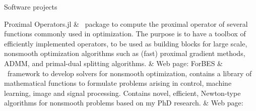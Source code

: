 \begin{cvsection}{Software projects \subtitle{GitHub profile: \href{\mygithubURL}{}}
	}
Proximal Operators.jl		& \ package to compute the proximal operator of several functions commonly used in optimization. The purpose is to have a toolbox of efficiently implemented operators, to be used as building blocks for large scale, nonsmooth optimization algorithms such as (fast) proximal gradient methods, ADMM, and primal-dual splitting algorithms. \spacednewline
			& Web page: \href{https://github.com/kul-forbes/ProximalOperators.jl}{}\spacednewline
ForBES		& \ framework to develop solvers for nonsmooth optimization, contains a library of mathematical functions to formulate problems arising in control, machine learning, image and signal processing.
Contains novel, efficient, Newton-type algorithms for nonsmooth problems based on my PhD research. \spacednewline
			& Web page: \href{https://kul-forbes.github.io/ForBES}{} \spacednewline
\end{cvsection}
